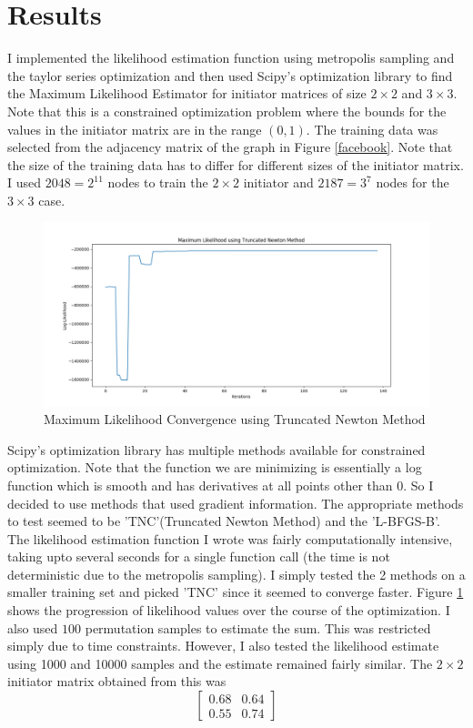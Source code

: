\documentclass[dvips,12pt]{article}
\begin{document}
\section{Results}
I implemented the likelihood estimation function using metropolis sampling and the taylor series optimization and then used Scipy's optimization library to find the Maximum Likelihood Estimator for initiator matrices of size $2 \times 2$ and $3 \times 3$. Note that this is a constrained optimization problem where the bounds for the values in the initiator matrix are in the range $(0,1)$. The training data was selected from the adjacency matrix of the graph in Figure \ref{facebook}. Note that the size of the training data has to differ for different sizes of the initiator matrix. I used $2048 = 2^{11}$ nodes to train the $2 \times 2$ initiator and $2187 = 3^7$ nodes for the $3 \times 3$ case. 
\\
\begin{figure}[!htb]
\centering
\includegraphics[scale=0.4]{Log-Likelihood-TNC}
\caption{Maximum Likelihood Convergence using Truncated Newton Method}
\label{mlec}
\end{figure}


Scipy's optimization library has multiple methods available for constrained optimization. Note that the function we are minimizing is essentially a log function which is smooth and has derivatives at all points other than $0$. So I decided to use methods that used gradient information. The appropriate methods to test seemed to be 'TNC'(Truncated Newton Method) and the 'L-BFGS-B'. The likelihood estimation function I wrote was fairly computationally intensive, taking upto several seconds for a single function call (the time is not deterministic due to the metropolis sampling). I simply tested the 2 methods on a smaller training set and picked 'TNC' since it seemed to converge faster. Figure \ref{mlec} shows the progression of likelihood values over the course of the optimization. I also used $100$ permutation samples to estimate the sum. This was restricted simply due to time constraints. However, I also tested the likelihood estimate using 1000 and 10000 samples and the estimate remained fairly similar. The $2 \times 2$ initiator matrix obtained from this was 
\[
\begin{bmatrix}
    0.68       & 0.64\\
    0.55     & 0.74
\end{bmatrix}
\]
\end{document}
